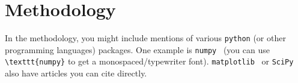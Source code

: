 \documentclass[final,a4paper,masters,nn,listoffigures,listoftables]{NMBU}
\begin{document}
\clearpage
\section{Methodology}

In the methodology, you might include mentions of various \texttt{python} (or other programming languages) packages. One example is \texttt{numpy}~\cite{NumPy}  (you can use \verb|\texttt{numpy}| to get a monospaced/typewriter font). \texttt{matplotlib}~\cite{Matplotlib} or \texttt{SciPy}~\cite{SciPy} also have articles you can cite directly.


\clearpage
{} %

\clearpage
\appendices %
\end{document}
